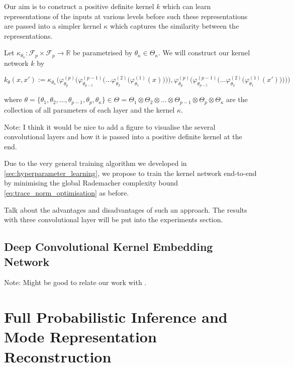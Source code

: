 \documentclass{article}
\newcommand{\note}[1]{{\color{orange} #1}}
\begin{document}
	Our aim is to construct a positive definite kernel $k$ which can learn representations of the inputs at various levels before such these representations are passed into a simpler kernel $\kappa$ which captures the similarity between the representations.
	
	Let $\kappa_{\theta_{\kappa}} : \mathcal{F}_{p} \times \mathcal{F}_{p} \to \mathbb{R}$ be parametrised by $\theta_{\kappa} \in \Theta_{\kappa}$. We will construct our kernel network $k$ by
	
	\begin{equation}
		k_{\theta}(x, x') := \kappa_{\theta_{\kappa}}\Bigg(
		\varphi^{(p)}_{\theta_{p}}\bigg(\varphi^{(p - 1)}_{\theta_{p - 1}}\Big(\dots\varphi^{(2)}_{\theta_{2}}\big(\varphi^{(1)}_{\theta_{1}}(x)\big)\Big)\bigg),
		\varphi^{(p)}_{\theta_{p}}\bigg(\varphi^{(p - 1)}_{\theta_{p - 1}}\Big(\dots\varphi^{(2)}_{\theta_{2}}\big(\varphi^{(1)}_{\theta_{1}}(x')\big)\Big)\bigg)
		\Bigg)
	\label{eq:deep_kernel_embedding_network}
	\end{equation}
	
	where $\theta = \{\theta_{1}, \theta_{2}, \dots, \theta_{p -1}, \theta_{p}, \theta_{\kappa}\} \in \Theta = \Theta_{1} \otimes \Theta_{2} \otimes \dots \otimes \Theta_{p - 1} \otimes \Theta_{p} \otimes \Theta_{\kappa}$ are the collection of all parameters of each layer and the kernel $\kappa$.
	
	\note{Note: I think it would be nice to add a figure to visualise the several convolutional layers and how it is passed into a positive definite kernel at the end.}
	
	Due to the very general training algorithm we developed in \cref{sec:hyperparameter_learning}, we propose to train the kernel network end-to-end by minimising the global Rademacher complexity bound \eqref{eq:trace_norm_optimisation} as before. 
	
	\note{Talk about the advantages and disadvantages of such an approach. The results with three convolutional layer will be put into the experiments section.}
	
	\subsection{Deep Convolutional Kernel Embedding Network}
	
		\note{Note: Might be good to relate our work with \citep{mairal2014convolutional}.}
	
\section{Full Probabilistic Inference and Mode Representation Reconstruction}
\label{sec:mode_reconstruction}
\end{document}

